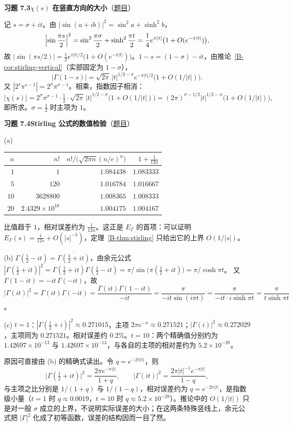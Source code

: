 \documentclass[11pt,a4paper]{article}
\newcommand{\bref}[1]{\ref*{B-#1}}
\newcommand{\Sol}[2]{%
  \par\addvspace{1.2em}\noindent
  \hypertarget{s:#1}{}\textbf{习题 #1\quad #2}\hfill{\small（\hyperlink{q:#1}{题目}）}\par
  \nopagebreak\smallskip}
\begin{document}
\Sol{7.3}{$\chi(s)$ 在竖直方向的大小}
记 $s=\sigma+it$。由 $|\sin(a+ib)|^2=\sin^2a+\sinh^2b$，
\[
  \Bigl|\sin\frac{\pi s}2\Bigr|^2=\sin^2\frac{\pi\sigma}2+\sinh^2\frac{\pi t}2=\frac14e^{\pi|t|}\bigl(1+O(e^{-\pi|t|})\bigr),
\]
故 $|\sin(\pi s/2)|=\tfrac12e^{\pi|t|/2}\bigl(1+O(e^{-\pi|t|})\bigr)$。$1-s=(1-\sigma)-it$，由推论~\bref{cor:stirling-vertical}（实部固定为 $1-\sigma$），
\[
  |\Gamma(1-s)|=\sqrt{2\pi}\,|t|^{1/2-\sigma}e^{-\pi|t|/2}\bigl(1+O(1/|t|)\bigr).
\]
又 $|2^s\pi^{s-1}|=2^\sigma\pi^{\sigma-1}$。相乘，指数因子相消：
\[
  |\chi(s)|=2^\sigma\pi^{\sigma-1}\cdot\tfrac12\cdot\sqrt{2\pi}\,|t|^{1/2-\sigma}\bigl(1+O(1/|t|)\bigr)
  =(2\pi)^{\sigma-1/2}|t|^{1/2-\sigma}\bigl(1+O(1/|t|)\bigr),
\]
即所求。$\sigma=\tfrac12$ 时主项为 $1$。

\Sol{7.4}{Stirling 公式的数值检验}
(a)
\begin{center}
\begin{tabular}{rrrr}
\toprule
$n$ & $n!$ & $n!/\bigl(\sqrt{2\pi n}(n/e)^n\bigr)$ & $1+\frac1{12n}$\\
\midrule
$1$ & $1$ & $1.084438$ & $1.083333$\\
$5$ & $120$ & $1.016784$ & $1.016667$\\
$10$ & $3628800$ & $1.008365$ & $1.008333$\\
$20$ & $2.4329\times10^{18}$ & $1.004175$ & $1.004167$\\
\bottomrule
\end{tabular}
\end{center}
比值趋于 $1$，相对误差约为 $\frac1{12n}$。这正是 $E_\Gamma$ 的首项：可以证明 $E_\Gamma(s)=\frac1{12s}+O(|s|^{-3})$，定理~\bref{thm:stirling} 只给出它的上界 $O(1/|s|)$。

(b) $\Gamma(\tfrac12-it)=\overline{\Gamma(\tfrac12+it)}$，由余元公式
$|\Gamma(\tfrac12+it)|^2=\Gamma(\tfrac12+it)\Gamma(\tfrac12-it)=\pi/\sin\bigl(\pi(\tfrac12+it)\bigr)=\pi/\cosh\pi t$。
又 $\Gamma(1-it)=-it\,\Gamma(-it)$，故
$|\Gamma(it)|^2=\Gamma(it)\Gamma(-it)=\dfrac{\Gamma(it)\Gamma(1-it)}{-it}=\dfrac{\pi}{-it\sin(i\pi t)}=\dfrac{\pi}{-it\cdot i\sinh\pi t}=\dfrac{\pi}{t\sinh\pi t}$。

(c) $t=1$：$|\Gamma(\tfrac12+i)|^2\approx0.271015$，主项 $2\pi e^{-\pi}\approx0.271521$；$|\Gamma(i)|^2\approx0.272029$，主项同为 $0.271521$。相对误差约 $0.2\%$。$t=10$：两个精确值分别约为 $1.42697\times10^{-13}$ 与 $1.42697\times10^{-14}$，与各自的主项的相对差约为 $5.2\times10^{-28}$。

原因可直接由 (b) 的精确式读出。令 $q=e^{-2\pi|t|}$，则
\[
  \bigl|\Gamma(\tfrac12+it)\bigr|^2=\frac{2\pi e^{-\pi|t|}}{1+q},\qquad
  \bigl|\Gamma(it)\bigr|^2=\frac{2\pi|t|^{-1}e^{-\pi|t|}}{1-q},
\]
与主项之比分别是 $1/(1+q)$ 与 $1/(1-q)$，相对误差约为 $q=e^{-2\pi|t|}$，是指数级小量（$t=1$ 时 $q\approx0.0019$，$t=10$ 时 $q\approx5.2\times10^{-28}$）。推论中的 $O(1/|t|)$ 只是对一般 $\sigma$ 成立的上界，不说明实际误差的大小；在这两条特殊竖线上，余元公式把 $|\Gamma|^2$ 化成了初等函数，误差的结构因而一目了然。
\end{document}
